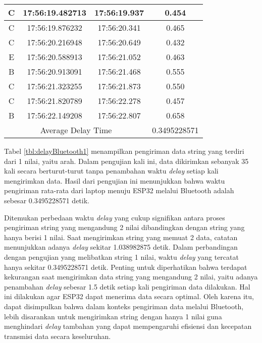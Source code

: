 \begin{longtable}{|ccc|c|}
  \multicolumn{1}{|c|}{C}    & \multicolumn{1}{c|}{17:56:19.482713} & 17:56:19.937       & 0.454        \\ \hline
  \multicolumn{1}{|c|}{C}    & \multicolumn{1}{c|}{17:56:19.876232} & 17:56:20.341       & 0.465        \\ \hline
  \multicolumn{1}{|c|}{C}    & \multicolumn{1}{c|}{17:56:20.216948} & 17:56:20.649       & 0.432        \\ \hline
  \multicolumn{1}{|c|}{E}    & \multicolumn{1}{c|}{17:56:20.588913} & 17:56:21.052       & 0.463        \\ \hline
  \multicolumn{1}{|c|}{B}    & \multicolumn{1}{c|}{17:56:20.913091} & 17:56:21.468       & 0.555        \\ \hline
  \multicolumn{1}{|c|}{C}    & \multicolumn{1}{c|}{17:56:21.323255} & 17:56:21.873       & 0.550        \\ \hline
  \multicolumn{1}{|c|}{C}    & \multicolumn{1}{c|}{17:56:21.820789} & 17:56:22.278       & 0.457        \\ \hline
  \multicolumn{1}{|c|}{B}    & \multicolumn{1}{c|}{17:56:22.149208} & 17:56:22.807       & 0.658        \\ \hline
  \multicolumn{3}{|c|}{Average Delay Time}                                               & 0.3495228571 \\ \hline
\end{longtable}

Tabel \ref{tbl:delayBluetooth1} menampilkan pengiriman data string yang terdiri dari 1 nilai, yaitu arah. Dalam pengujian kali ini, data dikirimkan sebanyak 35 kali secara berturut-turut tanpa penambahan waktu \emph{delay} setiap kali mengirimkan data. Hasil dari pengujian ini menunjukkan bahwa waktu pengiriman rata-rata dari laptop menuju ESP32 melalui Bluetooth adalah sebesar 0.3495228571 detik.

Ditemukan perbedaan waktu \emph{delay} yang cukup signifikan antara proses pengiriman string yang mengandung 2 nilai dibandingkan dengan string yang hanya berisi 1 nilai. Saat mengirimkan string yang memuat 2 data, catatan menunjukkan adanya \emph{delay} sekitar 1.038982875 detik. Dalam perbandingan dengan pengujian yang melibatkan string 1 nilai, waktu \emph{delay} yang tercatat hanya sekitar 0.3495228571 detik. Penting untuk diperhatikan bahwa terdapat kekurangan saat mengirimkan data string yang mengandung 2 nilai, yaitu adanya penambahan \emph{delay} sebesar 1.5 detik setiap kali pengiriman data dilakukan. Hal ini dilakukan agar ESP32 dapat menerima data secara optimal. Oleh karena itu, dapat disimpulkan bahwa dalam konteks pengiriman data melalui Bluetooth, lebih disarankan untuk mengirimkan string dengan hanya 1 nilai guna menghindari \emph{delay} tambahan yang dapat mempengaruhi efisiensi dan kecepatan transmisi data secara keseluruhan.

